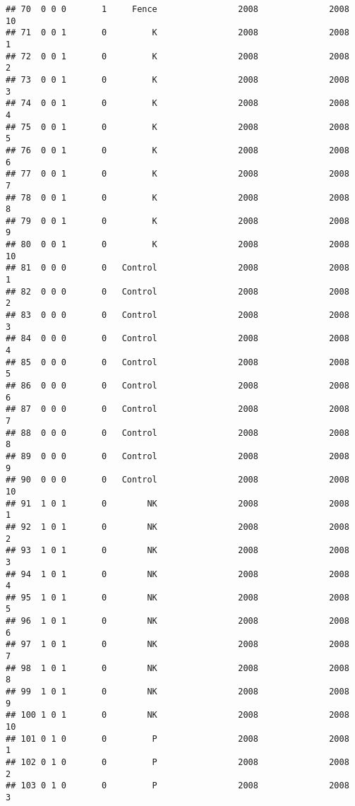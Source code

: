 \documentclass[]{article}
\begin{document}
\begin{verbatim}
## 70  0 0 0       1     Fence                2008              2008       10
## 71  0 0 1       0         K                2008              2008        1
## 72  0 0 1       0         K                2008              2008        2
## 73  0 0 1       0         K                2008              2008        3
## 74  0 0 1       0         K                2008              2008        4
## 75  0 0 1       0         K                2008              2008        5
## 76  0 0 1       0         K                2008              2008        6
## 77  0 0 1       0         K                2008              2008        7
## 78  0 0 1       0         K                2008              2008        8
## 79  0 0 1       0         K                2008              2008        9
## 80  0 0 1       0         K                2008              2008       10
## 81  0 0 0       0   Control                2008              2008        1
## 82  0 0 0       0   Control                2008              2008        2
## 83  0 0 0       0   Control                2008              2008        3
## 84  0 0 0       0   Control                2008              2008        4
## 85  0 0 0       0   Control                2008              2008        5
## 86  0 0 0       0   Control                2008              2008        6
## 87  0 0 0       0   Control                2008              2008        7
## 88  0 0 0       0   Control                2008              2008        8
## 89  0 0 0       0   Control                2008              2008        9
## 90  0 0 0       0   Control                2008              2008       10
## 91  1 0 1       0        NK                2008              2008        1
## 92  1 0 1       0        NK                2008              2008        2
## 93  1 0 1       0        NK                2008              2008        3
## 94  1 0 1       0        NK                2008              2008        4
## 95  1 0 1       0        NK                2008              2008        5
## 96  1 0 1       0        NK                2008              2008        6
## 97  1 0 1       0        NK                2008              2008        7
## 98  1 0 1       0        NK                2008              2008        8
## 99  1 0 1       0        NK                2008              2008        9
## 100 1 0 1       0        NK                2008              2008       10
## 101 0 1 0       0         P                2008              2008        1
## 102 0 1 0       0         P                2008              2008        2
## 103 0 1 0       0         P                2008              2008        3

\end{verbatim}
\end{document}

